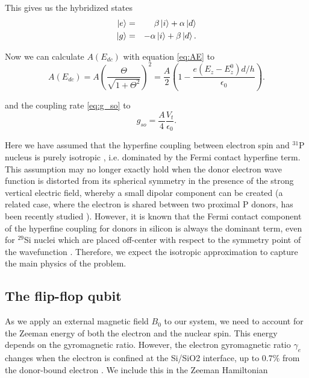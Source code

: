 This gives us the hybridized states 
\begin{equation}
\label{eq:hybridstates}
\begin{aligned}
\ket{e}&=&\beta \ket{i}+\alpha\ket{d}\\
\ket{g}&=&-\alpha \ket{i}+\beta \ket{d}.
\end{aligned}
\end{equation}



Now we can calculate $A(E_{dc})$ with equation \eqref{eq:AE} to
\begin{equation}
A(E_{dc})=A\left(\frac{\Theta}{\sqrt{1+\Theta^2}}\right)^2=\frac{A}{2}\left(1-\frac{e\left(E_z-E_z^0\right)d/h}{\epsilon_0}\right).
\end{equation}

and the coupling rate \eqref{eq:g_so} to
\begin{equation}
g_{so}=\frac{A}{4}\frac{V_t}{\epsilon_0}.
\end{equation}

Here we have assumed that the hyperfine coupling between electron spin and $^{31}$P nucleus is purely isotropic \cite{Feher1959}, i.e. dominated by the Fermi contact hyperfine term. This assumption may no longer exactly hold when the donor electron wave function is distorted from its spherical symmetry in the presence of the strong vertical electric field, whereby a small dipolar component can be created (a related case, where the electron is shared between two proximal P donors, has been recently studied \cite{Hile2018}). However, it is known that the Fermi contact component of the hyperfine coupling for donors in silicon is always the dominant term, even for $^{29}$Si nuclei which are placed off-center with respect to the symmetry point of the wavefunction \cite{Ivey1975}. Therefore, we expect the isotropic approximation to capture the main physics of the problem.


\subsection{The flip-flop qubit} \label{sec:flipflop}

As we apply an external magnetic field $B_0$ to our system, we need to account for the Zeeman energy of both the electron and the nuclear spin. This energy depends on the gyromagnetic ratio. However, the electron gyromagnetic ratio $\gamma_e$ changes when the electron is confined at the Si/SiO2 interface, up to $0.7\%$ from the donor-bound electron \cite{Rahman2009}. We include this in the Zeeman Hamiltonian

